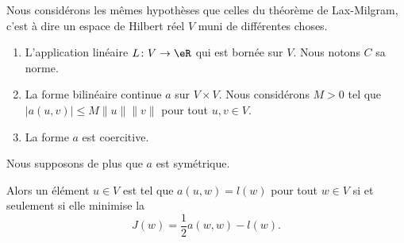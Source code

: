 \begin{theorem}
    Nous considérons les mêmes hypothèses que celles du théorème de Lax-Milgram, c'est à dire un espace de Hilbert réel \( V\) muni de différentes choses.
    \begin{enumerate}
        \item
            L'application linéaire \( L\colon V\to \eR\) qui est bornée sur \( V\). Nous notons \( C\) sa norme.
        \item
            La forme bilinéaire continue \( a\) sur \( V\times V\). Nous considérons \( M>0\) tel que \( | a(u,v) |\leq M\| u \|\| v \|\) pour tout \( u,v\in V\).
        \item
            La forme \( a\) est coercitive.
    \end{enumerate}
    Nous supposons de plus que \( a\) est symétrique. 

    Alors un élément \( u\in V\) est tel que \( a(u,w)=l(w)\) pour tout \( w\in V\) si et seulement si elle minimise la 
    \begin{equation}
        J(w)=\frac{ 1 }{2}a(w,w)-l(w).
    \end{equation}
\end{theorem}

